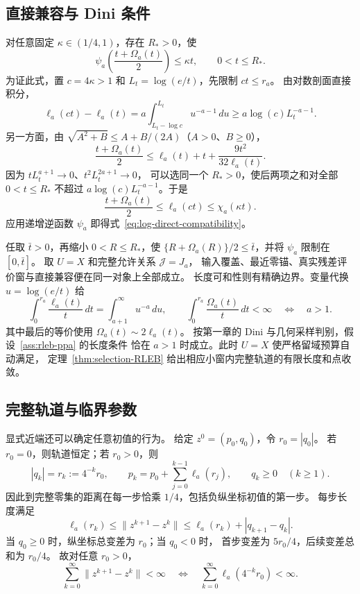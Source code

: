\subsection{直接兼容与 Dini 条件}

对任意固定 $\kappa\in(1/4,1)$，存在 $R_*>0$，使
\begin{equation}
\label{eq:log-direct-compatibility}
 \psi_a\left(\frac{t+\Omega_a(t)}2\right)\le\kappa t,
 \qquad 0<t\le R_*.
\end{equation}
为证此式，置 $c=4\kappa>1$ 和 $L_t=\log(e/t)$，先限制 $ct\le r_a$。
由对数剖面直接积分，
\[
 \ell_a(ct)-\ell_a(t)
 =a\int_{L_t-\log c}^{L_t}u^{-a-1}\,du
 \ge a\log(c)L_t^{-a-1}.
\]
另一方面，由 $\sqrt{A^2+B}\le A+B/(2A)$（$A>0$、$B\ge0$），
\[
 \frac{t+\Omega_a(t)}2
 \le\ell_a(t)+t+\frac{9t^2}{32\ell_a(t)}.
\]
因为 $tL_t^{a+1}\to0$、$t^2L_t^{2a+1}\to0$，
可以选同一个 $R_*>0$，使后两项之和对全部 $0<t\le R_*$
不超过 $a\log(c)L_t^{-a-1}$。于是
\[
 \frac{t+\Omega_a(t)}2\le\ell_a(ct)
 \le\chi_a(\kappa t).
\]
应用递增逆函数 $\psi_a$ 即得式~\eqref{eq:log-direct-compatibility}。

任取 $\bar t>0$，再缩小 $0<R\le R_*$，使
$\{R+\Omega_a(R)\}/2\le\bar t$，并将 $\psi_a$ 限制在 $[0,\bar t]$。
取 $U=X$ 和完整允许关系 $\mathcal J=J_a$，
输入覆盖、最近零锚、真实残差评价窗与直接兼容便在同一对象上全部成立。
长度可和性则有精确边界。变量代换 $u=\log(e/t)$ 给
\begin{equation}
\label{eq:log-Dini-threshold}
 \int_0^{r_a}\frac{\ell_a(t)}t\,dt
 =\int_{a+1}^{\infty}u^{-a}\,du,
 \qquad
 \int_0^{r_a}\frac{\Omega_a(t)}t\,dt<\infty
 \quad\Longleftrightarrow\quad a>1.
\end{equation}
其中最后的等价使用 $\Omega_a(t)\sim2\ell_a(t)$。
按第一章的 Dini 与几何采样判别，假设~\ref{ass:rleb-ppa} 的长度条件
恰在 $a>1$ 时成立。此时 $U=X$ 使严格留域预算自动满足，
定理~\ref{thm:selection-RLEB} 给出相应小窗内完整轨道的有限长度和点收敛。

\subsection{完整轨道与临界参数}

显式近端还可以确定任意初值的行为。
给定 $z^0=(p_0,q_0)$，令 $r_0=|q_0|$。
若 $r_0=0$，则轨道恒定；若 $r_0>0$，则
\begin{equation}
\label{eq:log-exact-orbit}
 |q_k|=r_k:=4^{-k}r_0,\qquad
 p_k=p_0+\sum_{j=0}^{k-1}\ell_a(r_j),
 \qquad q_k\ge0\quad(k\ge1).
\end{equation}
因此到完整零集的距离在每一步恰乘 $1/4$，包括负纵坐标初值的第一步。
每步长度满足
\[
 \ell_a(r_k)\le\|z^{k+1}-z^k\|
 \le\ell_a(r_k)+|q_{k+1}-q_k|.
\]
当 $q_0\ge0$ 时，纵坐标总变差为 $r_0$；当 $q_0<0$ 时，
首步变差为 $5r_0/4$，后续变差总和为 $r_0/4$。
故对任意 $r_0>0$，
\begin{equation}
\label{eq:log-length-equivalence}
 \sum_{k=0}^{\infty}\|z^{k+1}-z^k\|<\infty
 \quad\Longleftrightarrow\quad
 \sum_{k=0}^{\infty}\ell_a(4^{-k}r_0)<\infty.
\end{equation}

